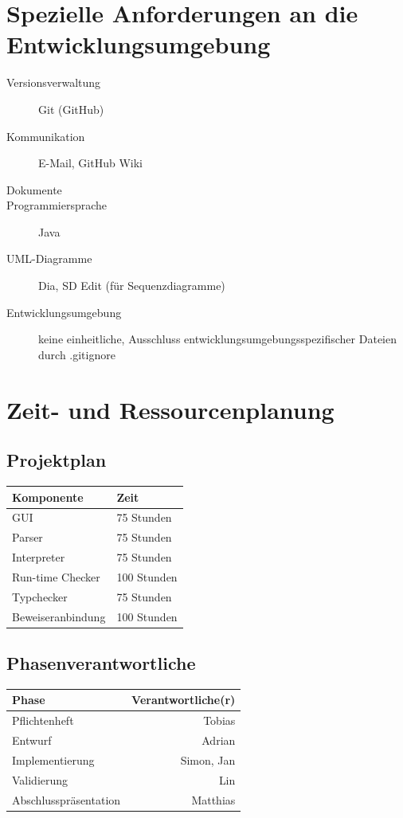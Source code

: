 \documentclass[a4paper,10pt]{article}
\begin{document}
\section{Spezielle Anforderungen an die Entwicklungsumgebung}
\begin{description}
  \item[Versionsverwaltung] Git (GitHub)
  \item[Kommunikation] E-Mail, GitHub Wiki
  \item[Dokumente] \LaTeXe
  \item[Programmiersprache] Java
  \item[UML-Diagramme] Dia, SD Edit (für Sequenzdiagramme)
  \item[Entwicklungsumgebung] keine einheitliche, Ausschluss entwicklungsumgebungsspezifischer Dateien durch .gitignore
\end{description}

\section{Zeit- und Ressourcenplanung}
\subsection{Projektplan}
\begin{tabular}[h]{| l | l |}
\textbf{Komponente} & \textbf{Zeit}\\
\hline
GUI & 75 Stunden\\
Parser & 75 Stunden\\
Interpreter & 75 Stunden\\
Run-time Checker & 100 Stunden\\
Typchecker & 75 Stunden\\
Beweiseranbindung & 100 Stunden\\
\end{tabular}
\subsection{Phasenverantwortliche}
\begin{tabular}[h]{| l | r |}
\hline
\textbf{Phase} & \textbf{Verantwortliche(r)}\\
\hline
Pflichtenheft & Tobias\\
\hline
Entwurf & Adrian\\
\hline
Implementierung & Simon, Jan\\
\hline
Validierung & Lin\\
\hline
Abschlusspr\"{a}sentation & Matthias\\
\hline
\end{tabular}
\end{document}
